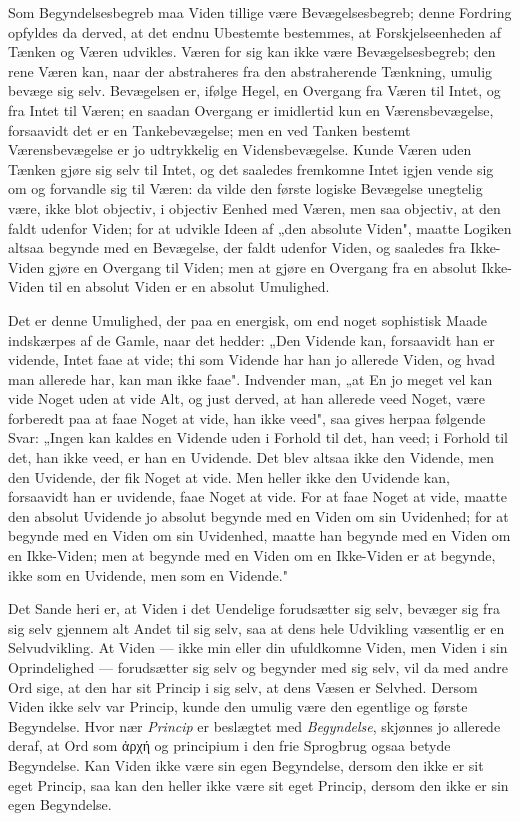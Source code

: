 \documentclass[12pt]{book}
\newcommand{\opage}[1]{\marginnote{\footnotesize\textit{[#1]}}}
\begin{document}
Som Begyndelsesbegreb maa Viden tillige være Bevægelsesbegreb; denne Fordring
opfyldes da derved, at det endnu Ubestemte bestemmes, at Forskjelseenheden af Tænken
og Væren udvikles. Væren for sig kan ikke være Bevægelsesbegreb; den rene Væren kan,
naar der abstraheres fra den abstraherende Tænkning, umulig bevæge sig selv.
Bevægelsen er, ifølge Hegel, en Overgang fra Væren til Intet, og fra Intet til Væren;
en saadan Overgang er imidlertid kun en Værensbevægelse, forsaavidt det er en
Tankebevægelse; men en ved Tanken bestemt Værensbevægelse er jo udtrykkelig en
Vidensbevægelse. Kunde Væren uden Tænken gjøre sig selv til Intet, og det saaledes
fremkomne Intet igjen vende sig om og forvandle sig til Væren: da vilde den første
logiske Bevægelse unegtelig være, ikke blot objectiv, i objectiv Eenhed med Væren,
men saa objectiv, at den faldt udenfor Viden; for at udvikle Ideen af „den absolute
Viden", maatte Logiken altsaa begynde med en Bevægelse, der faldt udenfor Viden, og
saaledes fra Ikke-Viden gjøre en Overgang til Viden; men at gjøre en
\opage{6} Overgang fra en absolut Ikke-Viden til en absolut Viden er en absolut Umulighed.

Det er denne Umulighed, der paa en energisk, om end noget sophistisk Maade
indskærpes af de Gamle, naar det hedder: „Den Vidende kan, forsaavidt han er vidende,
Intet faae at vide; thi som Vidende har han jo allerede Viden, og hvad man allerede
har, kan man ikke faae". Indvender man, „at En jo meget vel kan vide Noget uden at
vide Alt, og just derved, at han allerede veed Noget, være forberedt paa at faae
Noget at vide, han ikke veed", saa gives herpaa følgende Svar: „Ingen kan kaldes en
Vidende uden i Forhold til det, han veed; i Forhold til det, han ikke veed, er han en
Uvidende. Det blev altsaa ikke den Vidende, men den Uvidende, der fik Noget at vide.
Men heller ikke den Uvidende kan, forsaavidt han er uvidende, faae Noget at vide. For
at faae Noget at vide, maatte den absolut Uvidende jo absolut begynde med en Viden om
sin Uvidenhed; for at begynde med en Viden om sin Uvidenhed, maatte han begynde med
en Viden om en Ikke-Viden; men at begynde med en Viden om en Ikke-Viden er at
begynde, ikke som en Uvidende, men som en Vidende."

Det Sande heri er, at Viden i det Uendelige forudsætter sig selv, bevæger sig fra sig
selv gjennem alt Andet til sig selv, saa at dens hele Udvikling væsentlig er en
Selvudvikling. At Viden --- ikke min eller din ufuldkomne Viden, men Viden i sin
Oprindelighed --- forudsætter sig selv og begynder med sig selv, vil da med andre Ord
sige, at den har sit Princip i sig selv, at dens Væsen er Selvhed. Dersom Viden ikke
selv var Princip, kunde den umulig være den egentlige og første Begyndelse. Hvor nær
\emph{Princip} er beslægtet med \emph{Begyndelse}, skjønnes jo allerede deraf, at Ord
som ἀρχή og principium i den frie Sprogbrug ogsaa betyde Begyndelse. Kan Viden ikke
være sin egen Begyndelse, dersom den ikke er
\opage{7} sit eget Princip, saa kan den heller ikke være sit eget Princip, dersom den ikke er
sin egen Begyndelse.
\end{document}

